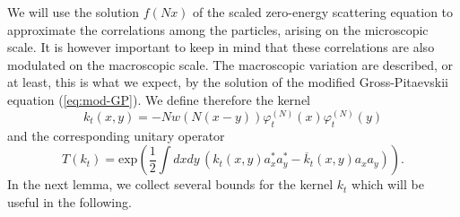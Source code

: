 \documentclass[11pt,a4paper]{article}
\newcommand{\ph}{\varphi_t^{(N)}}	%
\begin{document}
We will use the solution $f(Nx)$ of the scaled zero-energy scattering equation to approximate the correlations among the particles, arising on the microscopic scale. It is however important to keep in mind that these correlations are also modulated on the macroscopic scale. The macroscopic variation are described, or at least, this is what we expect, by the solution of the modified Gross-Pitaevskii equation (\ref{eq:mod-GP}). We define therefore the kernel
\begin{equation}\label{eq:kt} 
k_t (x,y)  = - N w (N (x-y)) \ph (x) \ph (y) \end{equation}
and the corresponding unitary operator
 \[ T (k_t) = \text{exp} \left( \frac{1}{2} \int dx dy \, \left( k_t (x,y) a_x^* a_y^* - \overline{k}_t (x,y) a_x a_y \right)\right). \]
In the next lemma, we collect several bounds for the kernel $k_t$ which will be useful in the following. 
\end{document}
